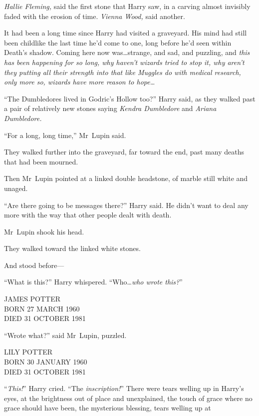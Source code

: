 \emph{Hallie Fleming,} said the first stone that Harry saw, in a carving almost invisibly faded with the erosion of time. \emph{Vienna Wood,} said another.

It had been a long time since Harry had visited a graveyard. His mind had still been childlike the last time he’d come to one, long before he’d seen within Death’s shadow. Coming here now was…strange, and sad, and puzzling, and \emph{this has been happening for so long, why haven’t wizards tried to stop it, why aren’t they putting all their strength into that like Muggles do with medical research, only more so, wizards have more reason to hope…}

“The Dumbledores lived in Godric’s Hollow too?” Harry said, as they walked past a pair of relatively new stones saying \emph{Kendra Dumbledore} and \emph{Ariana Dumbledore.}

“For a long, long time,” Mr~Lupin said.

They walked further into the graveyard, far toward the end, past many deaths that had been mourned.

Then Mr~Lupin pointed at a linked double headstone, of marble still white and unaged.

“Are there going to be messages there?” Harry said. He didn’t want to deal any more with the way that other people dealt with death.

Mr~Lupin shook his head.

They walked toward the linked white stones.

And stood before—

“What is this?” Harry whispered. “Who…\emph{who wrote this?}”

\begin{center}
JAMES POTTER\\
BORN 27 MARCH 1960\\
DIED 31 OCTOBER 1981
\end{center}

“Wrote what?” said Mr~Lupin, puzzled.

\begin{center}
LILY POTTER\\
BORN 30 JANUARY 1960\\
DIED 31 OCTOBER 1981
\end{center}

“\emph{This!}” Harry cried. “The \emph{inscription!}” There were tears welling up in Harry’s eyes, at the brightness out of place and unexplained, the touch of grace where no grace should have been, the mysterious blessing, tears welling up at

